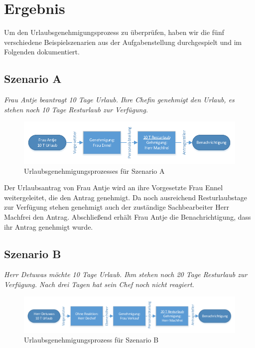 \section{Ergebnis}
Um den Urlaubsgenehmigungsprozess zu überprüfen, haben wir die fünf verschiedene Beispielszenarien aus der Aufgabenstellung durchgespielt und im Folgenden dokumentiert.

\subsection{Szenario A}
\textit{Frau Antje beantragt 10 Tage Urlaub. Ihre Chefin genehmigt den Urlaub, es stehen noch 10 Tage Resturlaub zur Verfügung.}

\begin{figure}[H]
\centering
\includegraphics[width=1.0\linewidth]{Bilder/BeispielA}
\caption{Urlaubsgenehmigungsprozesses für Szenario A}
\label{fig:BeispielA}
\end{figure}

Der Urlaubsantrag von Frau Antje wird an ihre Vorgesetzte Frau Ennel weitergeleitet, die den Antrag genehmigt. Da noch ausreichend Resturlaubstage zur Verfügung stehen genehmigt auch der zuständige Sachbearbeiter Herr Machfrei den Antrag. Abschließend erhält Frau Antje die Benachrichtigung, dass ihr Antrag genehmigt wurde.

\subsection{Szenario B}
\textit{Herr Detuwas möchte 10 Tage Urlaub. Ihm stehen noch 20 Tage Resturlaub zur Verfügung. Nach drei Tagen hat sein Chef noch nicht reagiert.}

\begin{figure}[H]
\centering
\includegraphics[width=1.0\linewidth]{Bilder/BeispielB}
\caption{Urlaubsgenehmigungsprozess für Szenario B}
\label{fig:BeispielB}
\end{figure}

